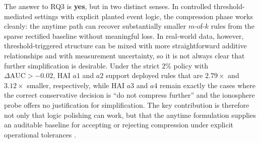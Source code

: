 The answer to RQ3 is \textbf{yes}, but in two distinct senses. In controlled threshold-mediated settings with explicit planted event logic, the compression phase works cleanly: the anytime path can recover substantially smaller $m$-of-$k$ rules from the sparse rectified baseline without meaningful loss. In real-world data, however, threshold-triggered structure can be mixed with more straightforward additive relationships and with measurement uncertainty, so it is not always clear that further simplification is desirable. Under the strict $2\%$ policy with $\Delta \mathrm{AUC}>-0.02$, HAI $a1$ and $a2$ support deployed rules that are $2.79\times$ and $3.12\times$ smaller, respectively, while HAI $a3$ and $a4$ remain exactly the cases where the correct conservative decision is ``do not compress further'' and the ionosphere probe offers no justification for simplification. The key contribution is therefore not only that logic polishing can work, but that the anytime formulation supplies an auditable baseline for accepting or rejecting compression under explicit operational tolerances \autocite{JOrender2025Anytime,JOrender2025Efficient}.
